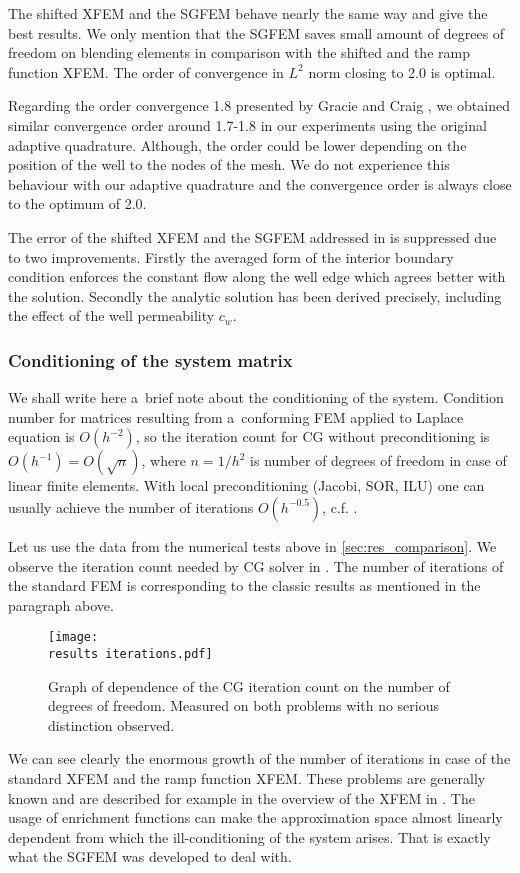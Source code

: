 The shifted XFEM and the SGFEM behave nearly the same way and give the best results. We only mention that the SGFEM saves 
small amount of degrees of freedom on blending elements in comparison with the shifted and the ramp function XFEM.
The order of convergence in $L^2$ norm closing to 2.0 is optimal.

Regarding the order convergence 1.8 presented by Gracie and Craig \cite{gracie_modelling_2010}, we obtained similar convergence order 
around 1.7-1.8 in our experiments using the original adaptive quadrature. Although, the order could be lower 
depending on the position of the well to the nodes of the mesh. We do not experience this behaviour with our adaptive
quadrature and the convergence order is always close to the optimum of 2.0.

The error of the shifted XFEM and the SGFEM addressed in \cite{exner_2016} is suppressed due to two improvements. 
Firstly the averaged form of the interior boundary condition enforces the constant flow along the well edge
which agrees better with the solution.
Secondly the analytic solution has been derived precisely, including the effect of the well permeability $c_w$.



\subsubsection{Conditioning of the system matrix} \label{sec:res_conditioning}
We shall write here a~brief note about the conditioning of the system.
Condition number for matrices resulting from a~conforming FEM applied to Laplace equation is $O(h^{-2})$, so the iteration count 
for CG without preconditioning is $O(h^{-1})=O(\sqrt{n})$, where $n=1/h^2$ is number of degrees of freedom in case of linear finite elements. 
With local preconditioning (Jacobi, 
SOR, ILU) one can usually achieve the number of iterations $O(h^{-0.5})$, c.f. \cite{ern_evaluation_2006}.

Let us use the data from the numerical tests above in \ref{sec:res_comparison}.
We observe the iteration count needed by CG solver in .
The number of iterations of the standard FEM is corresponding to the classic results as mentioned in the paragraph above. 

\begin{figure}[!htb]
  \centering    
  \texttt{[image: \\results iterations.pdf]}
  \caption[Iterations graph]{Graph of dependence of the CG iteration count on the 
  number of degrees of freedom. Measured on both problems with no serious distinction observed.}
  \label{fig:iterations}
\end{figure}
%
We can see clearly the enormous growth of the number of iterations in case of the standard XFEM and the ramp 
function XFEM. These problems are generally known and are described for example in the overview of the XFEM in
\cite{fries_xfem_overview_2010}. The usage of enrichment functions can make the approximation space almost linearly 
dependent from which the ill-conditioning of the system arises. That is exactly what the SGFEM was developed to deal with.

